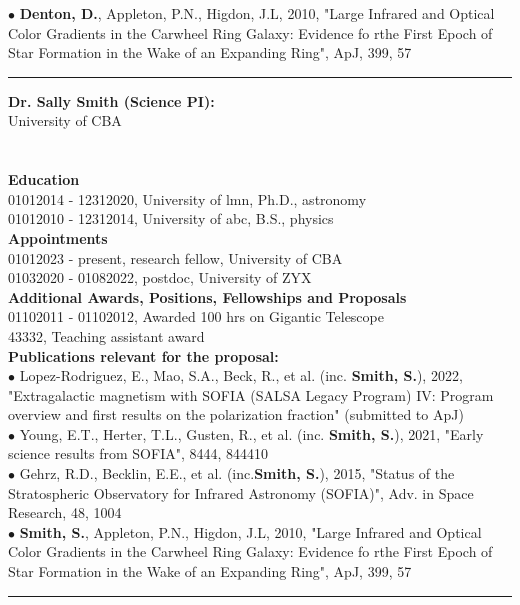 {\scriptsize{$\bullet$}} \textbf{Denton, D.}, Appleton, P.N., Higdon, J.L, 2010, "Large Infrared and Optical Color Gradients in the Carwheel Ring Galaxy: Evidence fo rthe First Epoch of Star Formation in the Wake of an Expanding Ring", ApJ, 399, 57\\
\medskip \hrule \vspace{5pt} \medskip
\textbf{\color{Blue}\large Dr. Sally Smith (Science PI):}\\
University of CBA\\
\\ \\ \vspace{-1em}
\textbf{Education}\\
01012014 - 12312020, University of lmn, Ph.D., astronomy\\
01012010 - 12312014, University of abc, B.S., physics\\
\textbf{Appointments}\\
01012023 - present, research fellow, University of CBA\\
01032020 - 01082022, postdoc, University of ZYX\\
\textbf{Additional Awards, Positions, Fellowships and Proposals}\\
01102011 - 01102012, Awarded 100 hrs on Gigantic Telescope\\
43332, Teaching assistant award\\
\textbf{Publications relevant for the proposal:}\\
{\scriptsize{$\bullet$}} Lopez-Rodriguez, E., Mao, S.A., Beck, R., et al. (inc. \textbf{Smith, S.}), 2022, "Extragalactic magnetism with SOFIA (SALSA Legacy Program) IV: Program overview and first results on the polarization fraction" (submitted to ApJ)\\
{\scriptsize{$\bullet$}} Young, E.T., Herter, T.L., Gusten, R., et al. (inc. \textbf{Smith, S.}), 2021, "Early science results from SOFIA", 8444, 844410\\
{\scriptsize{$\bullet$}} Gehrz, R.D., Becklin, E.E., et al. (inc.\textbf{Smith, S.}), 2015, "Status of the Stratospheric Observatory for Infrared Astronomy (SOFIA)", Adv. in Space Research, 48, 1004\\
{\scriptsize{$\bullet$}} \textbf{Smith, S.}, Appleton, P.N., Higdon, J.L, 2010, "Large Infrared and Optical Color Gradients in the Carwheel Ring Galaxy: Evidence fo rthe First Epoch of Star Formation in the Wake of an Expanding Ring", ApJ, 399, 57\\
\medskip \hrule \vspace{5pt} \medskip

